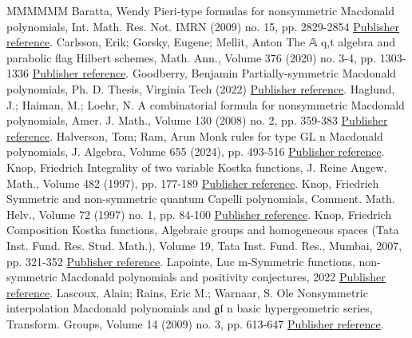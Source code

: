 \begin{thebibliography}{MMMMMM}
 Baratta, Wendy Pieri-type formulas for nonsymmetric Macdonald polynomials, Int. Math. Res. Not. IMRN (2009) no. 15, pp. 2829-2854 \href{https://alco.centre-mersenne.org/articles/10.5802/alco.388/#MR2525842}{Publisher reference}.
 Carlsson, Erik; Gorsky, Eugene; Mellit, Anton The 𝔸 q,t  algebra and parabolic flag Hilbert schemes, Math. Ann., Volume 376 (2020) no. 3-4, pp. 1303-1336 \href{https://alco.centre-mersenne.org/articles/10.5802/alco.388/#MR4081116}{Publisher reference}.
 Goodberry, Benjamin Partially-symmetric Macdonald polynomials, Ph. D. Thesis, Virginia Tech (2022) \href{https://alco.centre-mersenne.org/articles/10.5802/alco.388/#Dissertation}{Publisher reference}.
 Haglund, J.; Haiman, M.; Loehr, N. A combinatorial formula for nonsymmetric Macdonald polynomials, Amer. J. Math., Volume 130 (2008) no. 2, pp. 359-383 \href{https://alco.centre-mersenne.org/articles/10.5802/alco.388/#MR2405160}{Publisher reference}.
 Halverson, Tom; Ram, Arun Monk rules for type GL n  Macdonald polynomials, J. Algebra, Volume 655 (2024), pp. 493-516 \href{https://alco.centre-mersenne.org/articles/10.5802/alco.388/#MR4756478}{Publisher reference}.
 Knop, Friedrich Integrality of two variable Kostka functions, J. Reine Angew. Math., Volume 482 (1997), pp. 177-189 \href{https://alco.centre-mersenne.org/articles/10.5802/alco.388/#MR1427661}{Publisher reference}.
 Knop, Friedrich Symmetric and non-symmetric quantum Capelli polynomials, Comment. Math. Helv., Volume 72 (1997) no. 1, pp. 84-100 \href{https://alco.centre-mersenne.org/articles/10.5802/alco.388/#MR1456318}{Publisher reference}.
 Knop, Friedrich Composition Kostka functions, Algebraic groups and homogeneous spaces (Tata Inst. Fund. Res. Stud. Math.), Volume 19, Tata Inst. Fund. Res., Mumbai, 2007, pp. 321-352 \href{https://alco.centre-mersenne.org/articles/10.5802/alco.388/#MR2348910}{Publisher reference}.
 Lapointe, Luc m-Symmetric functions, non-symmetric Macdonald polynomials and positivity conjectures, 2022 \href{https://alco.centre-mersenne.org/articles/10.5802/alco.388/#Lapointe}{Publisher reference}.
 Lascoux, Alain; Rains, Eric M.; Warnaar, S. Ole Nonsymmetric interpolation Macdonald polynomials and \(\mathfrak{g}\)\(\mathfrak{l}\) n  basic hypergeometric series, Transform. Groups, Volume 14 (2009) no. 3, pp. 613-647 \href{https://alco.centre-mersenne.org/articles/10.5802/alco.388/#MR2534801}{Publisher reference}.

\end{thebibliography}
